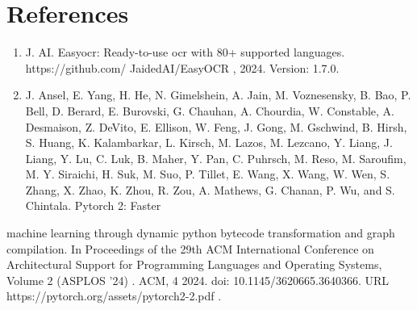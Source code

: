 \documentclass[11pt,a4paper]{article}
\begin{document}
\section{References}

\begin{enumerate}
\item J. AI. Easyocr: Ready-to-use ocr with 80+ supported languages. https://github.com/ JaidedAI/EasyOCR , 2024. Version: 1.7.0.
\item J. Ansel, E. Yang, H. He, N. Gimelshein, A. Jain, M. Voznesensky, B. Bao, P. Bell, D. Berard, E. Burovski, G. Chauhan, A. Chourdia, W. Constable, A. Desmaison, Z. DeVito, E. Ellison, W. Feng, J. Gong, M. Gschwind, B. Hirsh, S. Huang, K. Kalambarkar, L. Kirsch, M. Lazos, M. Lezcano, Y. Liang, J. Liang, Y. Lu, C. Luk, B. Maher, Y. Pan, C. Puhrsch, M. Reso, M. Saroufim, M. Y. Siraichi, H. Suk, M. Suo, P. Tillet, E. Wang, X. Wang, W. Wen, S. Zhang, X. Zhao, K. Zhou, R. Zou, A. Mathews, G. Chanan, P. Wu, and S. Chintala. Pytorch 2: Faster
\end{enumerate}

machine learning through dynamic python bytecode transformation and graph compilation. In Proceedings of the 29th ACM International Conference on Architectural Support for Programming Languages and Operating Systems, Volume 2 (ASPLOS '24) . ACM, 4 2024. doi: 10.1145/3620665.3640366. URL https://pytorch.org/assets/pytorch2-2.pdf .
\end{document}

